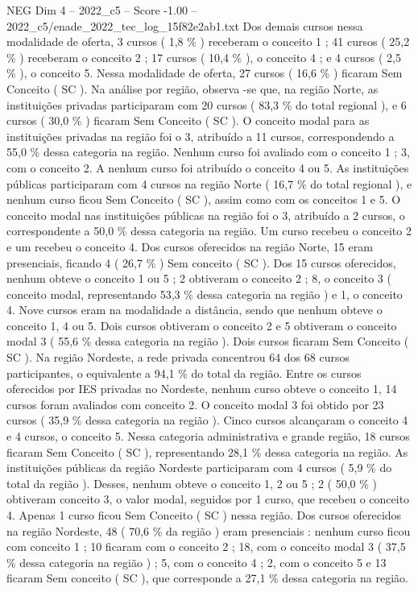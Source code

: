 \begin{textsample}{NEG Dim 4 – 2022\_c5 – Score -1.00 – 2022\_c5/enade\_2022\_tec\_log\_15f82e2ab1.txt}
Dos demais cursos nessa modalidade de oferta, 3 cursos ( 1,8 \% ) receberam o conceito 1 ; 41 cursos ( 25,2 \% ) receberam o conceito 2 ; 17 cursos ( 10,4 \% ), o conceito 4 ; e 4 cursos ( 2,5 \% ), o conceito 5.
Nessa modalidade de oferta, 27 cursos ( 16,6 \% ) ficaram Sem Conceito ( SC ).
Na análise por região, observa -se que, na região Norte, as instituições privadas participaram com 20 cursos ( 83,3 \% do total regional ), e 6 cursos ( 30,0 \% ) ficaram Sem Conceito ( SC ).
O conceito modal para as instituições privadas na região foi o 3, atribuído a 11 cursos, correspondendo a 55,0 \% dessa categoria na região.
Nenhum curso foi avaliado com o conceito 1 ; 3, com o conceito 2.
A nenhum curso foi atribuído o conceito 4 ou 5.
As instituições públicas participaram com 4 cursos na região Norte ( 16,7 \% do total regional ), e nenhum curso ficou Sem Conceito ( SC ), assim como com os conceitos 1 e 5.
O conceito modal nas instituições públicas na região foi o 3, atribuído a 2 cursos, o correspondente a 50,0 \% dessa categoria na região.
Um curso recebeu o conceito 2 e um recebeu o conceito 4.
Dos cursos oferecidos na região Norte, 15 eram presenciais, ficando 4 ( 26,7 \% ) Sem conceito ( SC ).
Dos 15 cursos oferecidos, nenhum obteve o conceito 1 ou 5 ; 2 obtiveram o conceito 2 ; 8, o conceito 3 ( conceito modal, representando 53,3 \% dessa categoria na região ) e 1, o conceito 4.
Nove cursos eram na modalidade a distância, sendo que nenhum obteve o conceito 1, 4 ou 5.
Dois cursos obtiveram o conceito 2 e 5 obtiveram o conceito modal 3 ( 55,6 \% dessa categoria na região ).
Dois cursos ficaram Sem Conceito ( SC ).
Na região Nordeste, a rede privada concentrou 64 dos 68 cursos participantes, o equivalente a 94,1 \% do total da região.
Entre os cursos oferecidos por IES privadas no Nordeste, nenhum curso obteve o conceito 1, 14 cursos foram avaliados com conceito 2.
O conceito modal 3 foi obtido por 23 cursos ( 35,9 \% dessa categoria na região ).
Cinco cursos alcançaram o conceito 4 e 4 cursos, o conceito 5.
Nessa categoria administrativa e grande região, 18 cursos ficaram Sem Conceito ( SC ), representando 28,1 \% dessa categoria na região.
As instituições públicas da região Nordeste participaram com 4 cursos ( 5,9 \% do total da região ).
Desses, nenhum obteve o conceito 1, 2 ou 5 ; 2 ( 50,0 \% ) obtiveram conceito 3, o valor modal, seguidos por 1 curso, que recebeu o conceito 4.
Apenas 1 curso ficou Sem Conceito ( SC ) nessa região.
Dos cursos oferecidos na região Nordeste, 48 ( 70,6 \% da região ) eram presenciais : nenhum curso ficou com conceito 1 ; 10 ficaram com o conceito 2 ; 18, com o conceito modal 3 ( 37,5 \% dessa categoria na região ) ; 5, com o conceito 4 ; 2, com o conceito 5 e 13 ficaram Sem conceito ( SC ), que corresponde a 27,1 \% dessa categoria na região.

\end{textsample}
